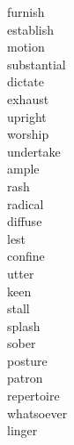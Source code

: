 \documentclass[b5paper, 11pt]{ctexart}
\begin{document}
\clearpage

\begin{multicols*}{3}
    \begin{description}

\item[furnish]

\item[establish]

\item[motion]

\item[substantial]

\item[dictate]

\item[exhaust]

\item[upright]

\item[worship]

\item[undertake]

\item[ample]

\item[rash]

\item[radical]

\item[diffuse]

\item[lest]

\item[confine]

\item[utter]

\item[keen]

\item[stall]

\item[splash]

\item[sober]

\item[posture]

\item[patron]

\item[repertoire]

\item[whatsoever]

\item[linger]


\end{description}
\end{multicols*}
\end{document}
